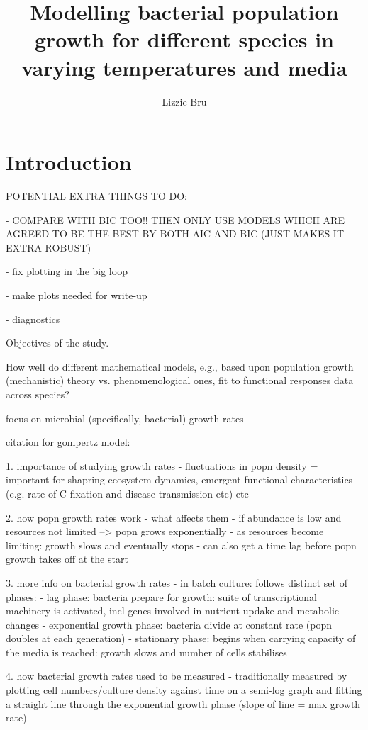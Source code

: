 \documentclass[11pt]{article}
\title{\textbf{Modelling bacterial population growth for different species in varying temperatures and media}}
\author[1]{Lizzie Bru}
\affil[1]{School of Life Sciences, Imperial College London, Silwood Park Campus, Ascot SL5 7PY, UK}
\date{}
\begin{document}
	
	\maketitle
	
	\newpage
	
	\section{Introduction}
	
	POTENTIAL EXTRA THINGS TO DO:
	
	- COMPARE WITH BIC TOO!! THEN ONLY USE MODELS WHICH ARE AGREED TO BE THE BEST BY BOTH AIC AND BIC (JUST MAKES IT EXTRA ROBUST)
	
	- fix plotting in the big loop
	
	- make plots needed for write-up
	
	- diagnostics
	
	
	
	
	
	Objectives of the study.
	
	
	How well do different mathematical models, e.g., based upon population growth (mechanistic) theory vs. phenomenological ones, fit to functional responses data across species?
	
	focus on microbial (specifically, bacterial) growth rates
	
	
	citation for gompertz model: \cite{gompertz1825xxiv}
	
	
	1. importance of studying growth rates
	- fluctuations in popn density = important for shapring ecosystem dynamics, emergent functional characteristics (e.g. rate of C fixation and disease transmission etc) etc
	
	2. how popn growth rates work - what affects them
	- if abundance is low and resources not limited --> popn grows exponentially
	- as resources become limiting: growth slows and eventually stops
	- can also get a time lag before popn growth takes off at the start
	
	3. more info on bacterial growth rates
	- in batch culture: follows distinct set of phases:
	- lag phase: bacteria prepare for growth: suite of transcriptional machinery is activated, incl genes involved in nutrient updake and metabolic changes
	- exponential growth phase: bacteria divide at constant rate (popn doubles at each generation)
	- stationary phase: begins when carrying capacity of the media is reached: growth slows and number of cells stabilises
	
	4. how bacterial growth rates used to be measured
	- traditionally measured by plotting cell numbers/culture density against time on a semi-log graph and fitting a straight line through the exponential growth phase (slope of line = max growth rate)
	
\end{document}
